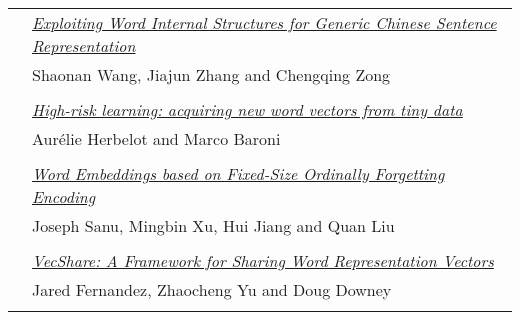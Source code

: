\begin{tabular}{p{20mm}p{128mm}}
 & \hyperlink{page.298}{\em Exploiting Word Internal Structures for Generic Chinese Sentence Representation}\\
         & Shaonan Wang, Jiajun Zhang and Chengqing Zong \\
\\

 & \hyperlink{page.304}{\em High-risk learning: acquiring new word vectors from tiny data}\\
         & Aur\'{e}lie Herbelot and Marco Baroni \\
\\

 & \hyperlink{page.310}{\em Word Embeddings based on Fixed-Size Ordinally Forgetting Encoding}\\
         & Joseph Sanu, Mingbin Xu, Hui Jiang and Quan Liu \\
\\

 & \hyperlink{page.316}{\em VecShare: A Framework for Sharing Word Representation Vectors}\\
         & Jared Fernandez, Zhaocheng Yu and Doug Downey \\
\\

\end{tabular}
\newpage
